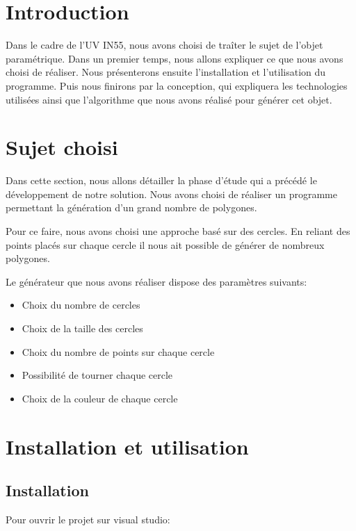 \documentclass[article, backcover, french, nodocumentinfo]{upmethodology-document}
\begin{document}
	\thispagestyle{empty}
	\upmdocumentsummary{}
	\upmdocumentauthors{}
	\upmdocumentinformedpeople{}
	\upmpublicationpage{}
	\newpage{}
	\tableofcontents{}
	\newpage{}
	\section{Introduction}
		Dans le cadre de l'UV IN55, nous avons choisi de traîter le sujet de l'objet paramétrique.
		Dans un premier temps, nous allons expliquer ce que nous avons choisi de réaliser.
		Nous présenterons ensuite l'installation et l'utilisation du programme.
		Puis nous finirons par la conception, qui expliquera les technologies utilisées ainsi que l'algorithme que nous avons réalisé pour générer cet objet.

	\section{Sujet choisi}
		Dans cette section, nous allons détailler la phase d'étude qui a précédé le développement de notre solution.
		Nous avons choisi de réaliser un programme permettant la génération d'un grand nombre de polygones.
		
		Pour ce faire, nous avons choisi une approche basé sur des cercles.
		En reliant des points placés sur chaque cercle il nous ait possible de générer de nombreux polygones.

		Le générateur que nous avons réaliser dispose des paramètres suivants:
		\begin{itemize}
			\item Choix du nombre de cercles
			\item Choix de la taille des cercles
			\item Choix du nombre de points sur chaque cercle
			\item Possibilité de tourner chaque cercle
			\item Choix de la couleur de chaque cercle
		\end{itemize}
	\section{Installation et utilisation}
		\subsection{Installation}
		Pour ouvrir le projet sur visual studio:
\end{document}
